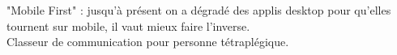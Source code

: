  "Mobile First" : jusqu'à présent on a dégradé des applis desktop pour qu'elles tournent sur mobile, il vaut mieux faire l'inverse. \\

 Classeur de communication pour personne tétraplégique.
